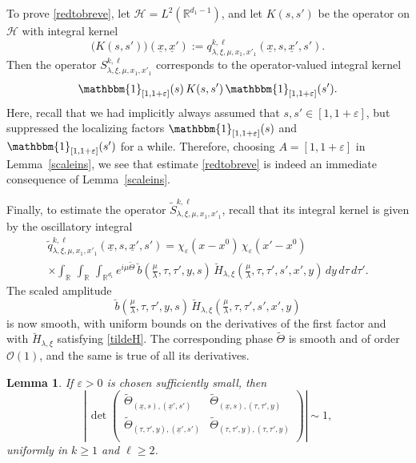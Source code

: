 \documentclass[leqno]{amsart}
\newtheorem{lemma}[theorem]{Lemma}
\theoremstyle{definition}
\theoremstyle{remark}
\numberwithin{equation}{section}
\newcommand{\bbone}{{\mathbbm{1}}}
\newcommand{\R}{\mathbb{R}}
\newcommand{\scriptH}{\mathcal{H}}
\newcommand\la{{\lambda}}
\newcommand\ve{{\varepsilon}}
\begin{document}
To prove \eqref{redtobreve}, let $\scriptH=L^2(\R^{d_1-1})$, and let $K(s,s')$ be the operator on $\scriptH$ with integral kernel
\[
\big(K(s,s')\big)(\underline x,\underline x')
:= q^{k,\ell}_{\lambda,\xi,\mu,x_1,x'_1}(\underline x,s,\underline x',s').
\]
Then the operator $S_{\lambda,\xi,\mu,x_1,x'_1}^{k,\ell}$ corresponds to the operator-valued integral kernel
\[
\bbone_{[1,1+\ve]}(s) \, K(s,s') \, \bbone_{[1,1+\ve]}(s').
\]
Here, recall that we had implicitly  always assumed that $s,s'\in [1,1+\ve]$, but suppressed the localizing factors $\bbone_{[1,1+\ve]}(s)$ and $\bbone_{[1,1+\ve]}(s')$ for a while. Therefore, choosing  $A=[1,1+\ve]$ in Lemma~\ref{scaleins},  we see that estimate \eqref{redtobreve} is indeed an  immediate consequence of Lemma~\ref{scaleins}.  

\medskip

Finally, to estimate the operator $\tilde S_{\lambda,\xi,\mu,x_1,x'_1}^{k,\ell}$, recall that its integral kernel is given by the oscillatory integral
\begin{multline*}
\tilde q^{k,\ell}_{\lambda,\xi,\mu,x_1,x'_1}
(\underline x,s,\underline x',s')
=
\chi_\varepsilon(x-x^0)\,
\chi_\varepsilon(x'-x^0)\\
\times
\int_\R\,\int_\R\,\int_{\R^{d_1}}
e^{i\mu\tilde\Theta}\,
\breve b(\tfrac\mu\la,\tau,\tau',y,s)\,
\breve H_{\la,\xi}
(\tfrac\mu\la,\tau,\tau',s',x',y)\,
dy\,d\tau\,d\tau'.
\end{multline*}
The scaled amplitude
\[
\breve b(\tfrac\mu\la,\tau,\tau',y,s)\,
\breve H_{\la,\xi}
(\tfrac\mu\la,\tau,\tau',s',x',y)
\]
is now smooth, with uniform bounds on the derivatives of the first factor and with $\breve H_{\la,\xi}$ satisfying \eqref{tildeH}. The corresponding phase $\tilde\Theta$ is smooth and of order $\mathcal{O}(1)$, and the same is true of all its derivatives.

\begin{lemma}\label{eq:MA-kl}
If $\ve>0$ is chosen sufficiently small, then
\[
\left|
\,\det
\begin{pmatrix}
\tilde\Theta_{(\underline x,s),(\underline x',s')} & \tilde\Theta_{(\underline x,s),(\tau,\tau',y)}\\
\tilde\Theta_{(\tau,\tau',y),(\underline x',s')} & \tilde\Theta_{(\tau,\tau',y),(\tau,\tau',y)}\\
\end{pmatrix}
\right|
\sim 1,
\]
uniformly in $k\ge 1$ and $\ell\ge 2$.
\end{lemma}
\end{document}
